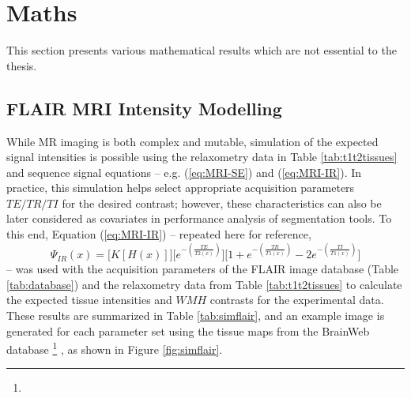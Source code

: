 \chapter{Maths}
This section presents various mathematical results which are not essential to the thesis.
\section{FLAIR MRI Intensity Modelling}\label{s:simflair}
While MR imaging is both complex and mutable, simulation of the expected signal intensities is possible using the relaxometry data in Table \ref{tab:t1t2tissues} and sequence signal equations -- e.g. (\ref{eq:MRI-SE}) and (\ref{eq:MRI-IR}).
In practice, this simulation helps select appropriate acquisition parameters $TE/TR/TI$ for the desired contrast;
however, these characteristics can also be later considered as covariates in performance analysis of segmentation tools.
To this end, Equation (\ref{eq:MRI-IR}) -- repeated here for reference,
\begin{equation}
\Psi_{IR}(x) = \bigg[K \left[H(x)\right]\bigg]\bigg[e^{-\left(\frac{TE}{T2(x)}\right)}\bigg]\bigg[1 + e^{-\left(\frac{TR}{T1(x)}\right)} - 2e^{-\left(\frac{TI}{T1(x)}\right)}\bigg]
\end{equation}
-- was used with the acquisition parameters of the FLAIR image database (Table \ref{tab:database}) and the relaxometry data from Table \ref{tab:t1t2tissues} to calculate the expected tissue intensities and $WMH$ contrasts for the experimental data.
These results are summarized in Table \ref{tab:simflair}, and an example image is generated for each parameter set using the tissue maps from the BrainWeb database \cite{Collins1998}%
\footnote{}%
, as shown in Figure \ref{fig:simflair}.
